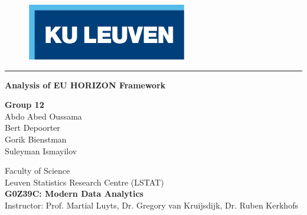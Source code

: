 \thispagestyle{empty}
\begin{figure}[h]
\includegraphics[width=7cm]{figures/logo_kul.png}
\end{figure}
\vspace*{5cm}

\begin{center}
\hrule 
\vspace{0.5cm}
\noindent
\huge{\textbf{Analysis of EU HORIZON Framework}} \\ 

\vfill
\end{center}

\begin{center}
\large{\textbf{Group 12}} \\

\normalsize{Abdo Abed Oussama} \\
\normalsize{Bert Depoorter} \\
\normalsize{Gorik Bienstman} \\
\normalsize{Suleyman Ismayilov}     
\end{center}
\vfill
\begin{flushleft}

\normalsize{Faculty of Science} \\
\normalsize{Leuven Statistics Research Centre (LSTAT)} \\
\normalsize{\textbf{G0Z39C: Modern Data Analytics}}\\
\normalsize{Instructor: Prof. Martial Luyts, Dr. Gregory van Kruijsdijk, Dr. Ruben Kerkhofs}

\end{flushleft}






\vspace{1cm}